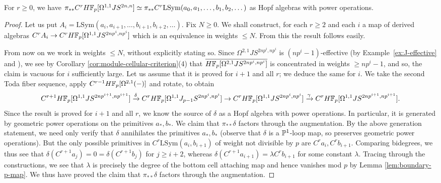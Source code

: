 \documentclass{amsart}
\renewcommand{\NB}[1]{}
\numberwithin{proposition}{section}
\numberwithin{equation}{section}
\def\LSym{\mathrm{LSym}}
\begin{document}
\begin{lemma} \label{lemm:loops2S3-main}
For $r \ge 0$, we have $\pi_{**} C^r H\F_p[\Omega^{1,1}JS^{2n,n}] \wequi \pi_{**} C^r \LSym(a_0, a_1, \dots, b_1, b_2, \dots)$ as Hopf algebras with power operations.
\end{lemma}
\begin{proof}
Let us put $A_i = \LSym(a_i, a_{i+1}, \dots, b_{i+1}, b_{i+2}, \dots)$.
Fix $N \ge 0$.
We shall construct, for each $r \ge 2$ and each $i$ a map of derived algebras $C^r A_i \to C^r H\F_p[\Omega^{1,1}JS^{2np^i,np^i}]$ which is an equivalence in weights $\le N$.
From this the result follows easily.\NB{obtain a sequence of generators, map in a free derived algebra, bar up as much as needed}

From now on we work in weights $\le N$, without explicitly stating so.
Since $\Omega^{2,1}JS^{2np^i,np^i}$ is $(np^i-1)$-effective (by Example~\ref{ex:J-effective} and \cite[Proposition~4.2.1(3)]{freudenthal}), we see by Corollary \ref{cor:module-cellular-criterion}(4) that $\overline{H\F_p[\Omega^{2,1}JS^{2np^i,np^i}]}$ is concentrated in weights $\ge np^i-1$, and so, the claim is vacuous for $i$ sufficiently large.
Let us assume that it is proved for $i+1$ and all $r$; we deduce the same for $i$.
We take the second Toda fiber sequence, apply $C^{r-1} H\F_p[\Omega^{2,1}(\ph)]$ and rotate, to obtain \[ C^{r+1}H\F_p[\Omega^{1,1}JS^{2np^{i+1},np^{i+1}}] \xrightarrow{\delta} C^rH\F_p[\Omega^{1,1}J_{p-1}S^{2np^i,np^i}] \to C^r H\F_p[\Omega^{1,1}JS^{2np^i,np^i}] \xrightarrow{\gamma} C^r H\F_p[\Omega^{1,1}JS^{2np^{i+1},np^{i+1}}]. \]
Since the result is proved for $i+1$ and all $r$, we know the source of $\delta$ as a Hopf algebra with power operations.
In particular, it is generated by geometric power operations on the primitives $a_*, b_*$.
We claim that $\pi_{**}\delta$ factors through the augmentation.
By the above generation statement, we need only verify that $\delta$ annihilates the primitives $a_*, b_*$ (observe that $\delta$ is a $\P^1$-loop map, so preserves geometric power operations).
But the only possible primitives in $C^r \LSym(a_i, b_{i+1})$ of weight not divisible by $p$ are $C^ra_i, C^rb_{i+1}$.
Comparing bidegrees, we thus see that $\delta(C^{r+1}a_j) = 0 = \delta(C^{r+1}b_j)$ for $j \ge i+2$, whereas $\delta(C^{r+1}a_{i+1}) = \lambda C^rb_{i+1}$ for some constant $\lambda$.
Tracing through the constructions, we see that $\lambda$ is precisely the degree of the bottom cell attaching map and hence vanishes mod $p$ by Lemma \ref{lem:boundary-p-map}.
We thus have proved the claim that $\pi_{**} \delta$ factors through the augmentation.

\end{proof}
\end{document}
